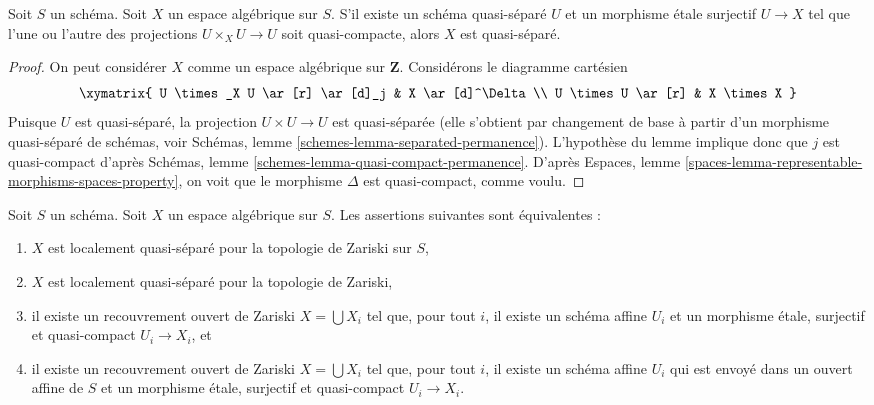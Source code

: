 \begin{lemma}
\label{lemma-quasi-separated}
Soit $S$ un schéma. Soit $X$ un espace algébrique sur $S$.
S'il existe un schéma quasi-séparé $U$ et un morphisme
étale surjectif $U \to X$ tel que l'une ou l'autre des projections
$U \times_X U \to U$ soit quasi-compacte, alors $X$ est quasi-séparé.
\end{lemma}

\begin{proof}
On peut considérer $X$ comme un espace algébrique sur $\mathbf{Z}$.
Considérons le diagramme cartésien
$$
\xymatrix{
U \times_X U \ar[r] \ar[d]_j & X \ar[d]^\Delta \\
U \times U \ar[r] & X \times X
}
$$
Puisque $U$ est quasi-séparé, la projection $U \times U \to U$ est
quasi-séparée (elle s'obtient par changement de base à partir d'un morphisme
quasi-séparé de schémas, voir Schémas, lemme \ref{schemes-lemma-separated-permanence}).
L'hypothèse du lemme implique donc que $j$ est quasi-compact d'après
Schémas, lemme \ref{schemes-lemma-quasi-compact-permanence}.
D'après Espaces, lemme \ref{spaces-lemma-representable-morphisms-spaces-property},
on voit que le morphisme $\Delta$ est quasi-compact, comme voulu.
\end{proof}

\begin{lemma}
\label{lemma-quasi-separated-quasi-compact-pieces}
Soit $S$ un schéma.
Soit $X$ un espace algébrique sur $S$.
Les assertions suivantes sont équivalentes :
\begin{enumerate}
\item $X$ est localement quasi-séparé pour la topologie de Zariski sur $S$,
\item $X$ est localement quasi-séparé pour la topologie de Zariski,
\item il existe un recouvrement ouvert de Zariski $X = \bigcup X_i$
tel que, pour tout $i$, il existe un schéma affine
$U_i$ et un morphisme étale, surjectif et quasi-compact
$U_i \to X_i$, et
\item il existe un recouvrement ouvert de Zariski $X = \bigcup X_i$
tel que, pour tout $i$, il existe un schéma affine
$U_i$ qui est envoyé dans un ouvert affine de $S$ et un morphisme
étale, surjectif et quasi-compact $U_i \to X_i$.
\end{enumerate}
\end{lemma}

